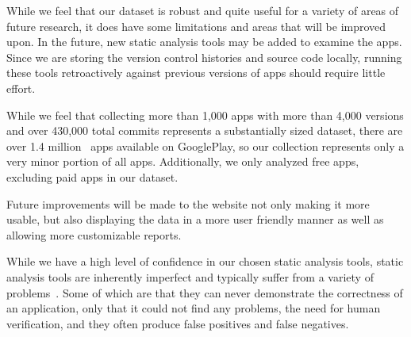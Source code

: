 

While we feel that our dataset is robust and quite useful for a variety of areas of future research, it does have some limitations and areas that will be improved upon. In the future, new static analysis tools may be added to examine the apps. Since we are storing the version control histories and source code locally, running these tools retroactively against previous versions of apps should require little effort.

While we feel that collecting more than 1,000 apps with more than 4,000 versions and over 430,000 total commits represents a substantially sized dataset, there are over 1.4 million~\cite{appBrain_stats} apps available on GooglePlay, so our collection represents only a very minor portion of all apps. Additionally, we only analyzed free apps, excluding paid apps in our dataset.

Future improvements will be made to the website not only making it more usable, but also displaying the data in a more user friendly manner as well as allowing more customizable reports.

While we have a high level of confidence in our chosen static analysis tools, static analysis tools are inherently imperfect and typically suffer from a variety of problems~\cite{chess2004static}. Some of which are that they can never demonstrate the correctness of an application, only that it could not find any problems, the need for human verification, and they often produce false positives and false negatives.


